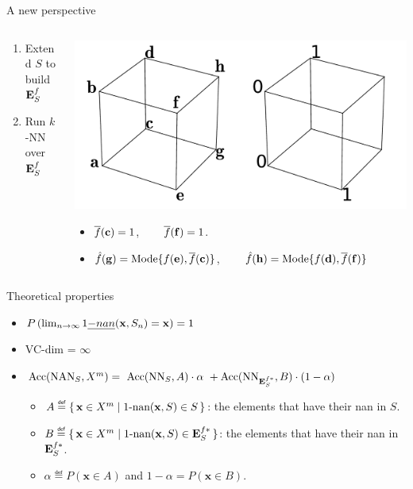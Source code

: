 \documentclass{beamer}
\begin{document}
\begin{frame}{A new perspective}
  \begin{columns}
    \begin{column}{.5\textwidth}
      \begin{enumerate}
        \item Extend $S$ to build $\mathbf{E}_{S}^{f}$
        \item Run $k$-NN over $\mathbf{E}_{S}^{f}$
      \end{enumerate}
    \end{column}
    \begin{column}{.5\textwidth}
      \begin{center}
        \includegraphics[width=.8\textwidth]{figures/ae_example.pdf}
      \end{center}
      \begin{itemize}
      \item $\overline{f}(\mathbf{c}) = 1$, ~~~
        $\overline{f}(\mathbf{f}) = 1$.
      \item $\hat{f}(\mathbf{g}) = \text{Mode}\{f(\mathbf{e}),
        \overline{f}(\mathbf{c})\}$, ~~~
            $\hat{f}(\mathbf{h}) = \text{Mode}\{f(\mathbf{d}),
            \overline{f}(\mathbf{f})\}$
      \end{itemize}
    \end{column}
  \end{columns}
\end{frame}

\begin{frame}{Theoretical properties}
  \begin{itemize}
    \item $P\left(\lim_{n \to \infty} 1\emph{-nan}(\mathbf{x}, S_n) =
      \mathbf{x}\right) = 1$
    \item VC-dim = $\infty$
    \item $\mbox{Acc}(\mbox{NAN}_S, X^m) = ~\mbox{Acc}(\text{NN}_S, A) \cdot \alpha ~ +
      \mbox{Acc}(\text{NN}_{\mathbf{E}_{S}^{f*}}, B) \cdot (1 - \alpha) $
    \begin{itemize}
    \item $A \eqdef \set{\mathbf{x} \in X^m | \nan(\mathbf{x}, S) \in S}$: the
      elements that have their nan in $S$.
    \item $B \eqdef \set{\mathbf{x} \in X^m | \nan(\mathbf{x}, S) \in \esfs}$: the
      elements that have their nan in $\mathbf{E}_{S}^{f*}$.
    \item $\alpha \eqdef P(\mathbf{x} \in A)$ and $1 - \alpha = P(\mathbf{x} \in
      B)$.
  \end{itemize}
  \end{itemize}
\end{frame}
\end{document}
